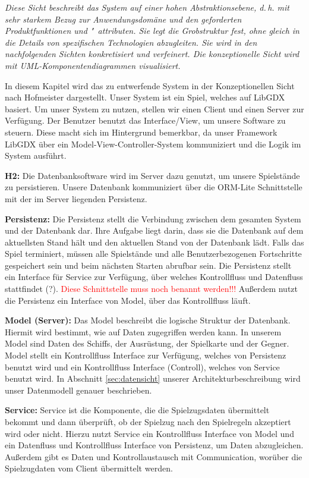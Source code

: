 \documentclass[fontsize=12pt,paper=a4,twoside]{scrartcl}
\begin{document}
{\itshape Diese Sicht beschreibt das System auf einer hohen Abstraktionsebene,
d.\,h. mit sehr starkem Bezug zur Anwendungsdomäne und den geforderten
Produktfunktionen und "~attributen. Sie legt die Grobstruktur fest, ohne gleich 
in die Details von spezifischen Technologien abzugleiten. Sie wird in den 
nachfolgenden Sichten konkretisiert und verfeinert. Die konzeptionelle Sicht 
wird mit {UML}-Komponentendiagrammen visualisiert.}

In diesem Kapitel wird das zu entwerfende System in der Konzeptionellen Sicht nach Hofmeister dargestellt. Unser System ist ein Spiel, welches auf LibGDX basiert. Um unser System zu nutzen, stellen wir einen Client und einen Server zur Verfügung. Der Benutzer benutzt das Interface/View, um unsere Software zu steuern. Diese macht sich im Hintergrund bemerkbar, da unser Framework LibGDX über ein Model-View-Controller-System kommuniziert und die Logik im System ausführt. 

\textbf{H2:} 
Die Datenbanksoftware wird im Server dazu genutzt, um unsere Spielstände zu persistieren. Unsere Datenbank kommuniziert über die ORM-Lite Schnittstelle mit der im Server liegenden Persistenz. 

\textbf{Persistenz:}
Die Persistenz stellt die Verbindung zwischen dem gesamten System und der Datenbank dar. Ihre Aufgabe liegt darin, dass sie die Datenbank auf dem aktuellsten Stand hält und den aktuellen Stand von der Datenbank lädt. Falls das Spiel terminiert, müssen alle Spielstände und alle Benutzerbezogenen Fortschritte gespeichert sein und beim nächsten Starten abrufbar sein. Die Persistenz stellt ein Interface für Service zur Verfügung, über welches Kontrollfluss und Datenfluss stattfindet (?).	\textcolor{red}{Diese Schnittstelle muss noch benannt werden!!!} Außerdem nutzt die Persistenz ein Interface von Model, über das Kontrollfluss läuft. 

\textbf{Model (Server):}
Das Model beschreibt die logische Struktur der Datenbank. Hiermit wird bestimmt, wie auf Daten zugegriffen werden kann. 
In unserem Model sind Daten des Schiffs, der Ausrüstung, der Spielkarte und der Gegner. Model stellt ein Kontrollfluss Interface zur Verfügung, welches von Persistenz benutzt wird und ein Kontrollfluss Interface (Controll), welches von Service benutzt wird. In Abschnitt \ref{sec:datensicht} unserer Architekturbeschreibung wird unser Datenmodell genauer beschrieben. 

\textbf{Service:}
Service ist die Komponente, die die Spielzugsdaten übermittelt bekommt und dann überprüft, ob der Spielzug nach den Spielregeln akzeptiert wird oder nicht. Hierzu nutzt Service ein Kontrollfluss Interface von Model und ein Datenfluss und Kontrollfluss Interface von Persistenz, um Daten abzugleichen. Außerdem gibt es Daten und Kontrollaustausch mit Communication, worüber die Spielzugdaten vom Client übermittelt werden. 
\end{document}
